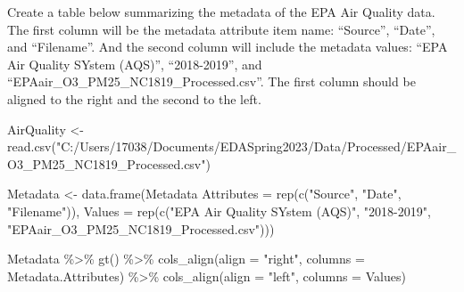 \documentclass[
]{article}
\newenvironment{Shaded}{\begin{snugshade}}{\end{snugshade}}
\newcommand{\AttributeTok}[1]{\textcolor[rgb]{0.77,0.63,0.00}{#1}}
\newcommand{\ConstantTok}[1]{\textcolor[rgb]{0.00,0.00,0.00}{#1}}
\newcommand{\DecValTok}[1]{\textcolor[rgb]{0.00,0.00,0.81}{#1}}
\newcommand{\FunctionTok}[1]{\textcolor[rgb]{0.00,0.00,0.00}{#1}}
\newcommand{\NormalTok}[1]{#1}
\newcommand{\OtherTok}[1]{\textcolor[rgb]{0.56,0.35,0.01}{#1}}
\newcommand{\SpecialCharTok}[1]{\textcolor[rgb]{0.00,0.00,0.00}{#1}}
\newcommand{\StringTok}[1]{\textcolor[rgb]{0.31,0.60,0.02}{#1}}
\begin{document}
Create a table below summarizing the metadata of the EPA Air Quality
data. The first column will be the metadata attribute item name:
``Source'', ``Date'', and ``Filename''. And the second column will
include the metadata values: ``EPA Air Quality SYstem (AQS)'',
``2018-2019'', and ``EPAair\_O3\_PM25\_NC1819\_Processed.csv''. The
first column should be aligned to the right and the second to the left.

\begin{Shaded}
\end{Shaded}

\begin{Shaded}
\begin{Highlighting}[]
\NormalTok{AirQuality }\OtherTok{\textless{}{-}} \FunctionTok{read.csv}\NormalTok{(}\StringTok{"C:/Users/17038/Documents/EDASpring2023/Data/Processed/EPAair\_O3\_PM25\_NC1819\_Processed.csv"}\NormalTok{)}

\NormalTok{Metadata }\OtherTok{\textless{}{-}} \FunctionTok{data.frame}\NormalTok{(}\StringTok{\textasciigrave{}}\AttributeTok{Metadata Attributes}\StringTok{\textasciigrave{}} \OtherTok{=} \FunctionTok{rep}\NormalTok{(}\FunctionTok{c}\NormalTok{(}\StringTok{"Source"}\NormalTok{, }\StringTok{"Date"}\NormalTok{, }\StringTok{"Filename"}\NormalTok{)),}
    \AttributeTok{Values =} \FunctionTok{rep}\NormalTok{(}\FunctionTok{c}\NormalTok{(}\StringTok{"EPA Air Quality SYstem (AQS)"}\NormalTok{, }\StringTok{"2018{-}2019"}\NormalTok{, }\StringTok{"EPAair\_O3\_PM25\_NC1819\_Processed.csv"}\NormalTok{)))}

\NormalTok{Metadata }\SpecialCharTok{\%\textgreater{}\%}
    \FunctionTok{gt}\NormalTok{() }\SpecialCharTok{\%\textgreater{}\%}
    \FunctionTok{cols\_align}\NormalTok{(}\AttributeTok{align =} \StringTok{"right"}\NormalTok{, }\AttributeTok{columns =}\NormalTok{ Metadata.Attributes) }\SpecialCharTok{\%\textgreater{}\%}
    \FunctionTok{cols\_align}\NormalTok{(}\AttributeTok{align =} \StringTok{"left"}\NormalTok{, }\AttributeTok{columns =}\NormalTok{ Values)}
\end{Highlighting}
\end{Shaded}
\end{document}

